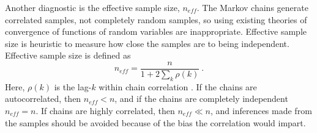 Another diagnostic is the effective sample size, $ n_{eff} $.  The Markov chains generate correlated samples, not completely random samples, so using existing theories of convergence of functions of random variables are inappropriate.  Effective sample size is heuristic to measure how close the samples are to being independent.  Effective sample size is defined as
%
\[ n_{eff} = \dfrac{n}{1+ 2\displaystyle\sum_k \rho(k)} \>. \]
%
Here, $ \rho(k) $ is the lag-$k$ within chain correlation \cite{gelman2013bayesian,kass1998markov}.  If the chains are autocorrelated, then $n_{eff} <n$, and if the chains are completely independent $n_{eff} = n$. If chains are highly correlated, then $n_{eff} \ll n$, and inferences made from the samples should be avoided because of the bias the correlation would impart.